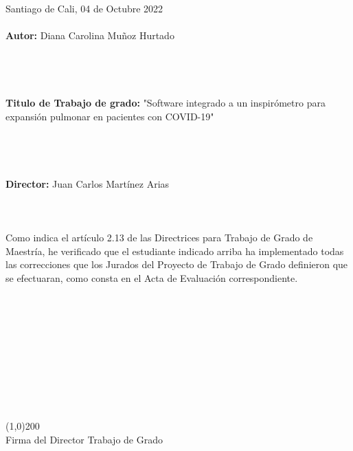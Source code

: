 



Santiago de Cali, 04 de Octubre 2022
\\
\\

\textbf{Autor:} Diana Carolina Muñoz Hurtado\\
\\
\\
\\
\\
\textbf{Titulo de Trabajo de grado:} "Software integrado a un inspirómetro para expansión pulmonar en pacientes con COVID-19"\\
\\
\\
\\
\\
\textbf{Director:} Juan Carlos Martínez Arias
\\
\\
\\
\\
Como indica el artículo 2.13 de las Directrices para Trabajo de Grado de Maestría, he verificado que el estudiante indicado arriba ha implementado todas las correcciones que los Jurados del Proyecto de Trabajo de Grado definieron que se efectuaran, como consta en el Acta de Evaluación correspondiente.
\\
\\
\\
\\
\\
\\
\\
\\
\\
\\
\\

\line(1,0){200} \\
Firma del Director Trabajo de Grado\\





\newpage